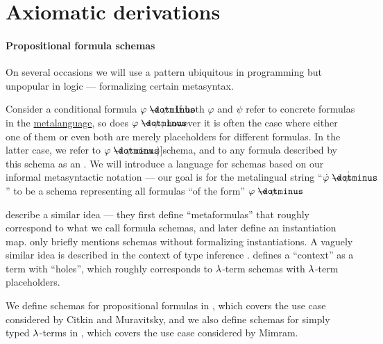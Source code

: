 \section{Axiomatic derivations}\label{sec:axiomatic_derivations}

\paragraph{Propositional formula schemas}

\begin{concept}\label{con:schemas_and_instances}
  On several occasions we will use a pattern ubiquitous in programming but unpopular in logic --- formalizing certain metasyntax.

  Consider a conditional formula \( \varphi \synimplies \psi \). If both \( \varphi \) and \( \psi \) refer to concrete formulas in the \hyperref[con:metalanguage]{metalanguage}, so does \( \varphi \synimplies \psi \), however it is often the case where either one of them or even both are merely placeholders for different formulas. In the latter case, we refer to \( \varphi \synimplies \psi \) as a \term[ru=схема (формул) (\cite[20]{Эдельман1975Логика})]{schema}, and to any formula described by this schema as an . We will introduce a language for schemas based on our informal metasyntactic notation --- our goal is for the metalingual string \enquote{\( \syn\varphi \synimplies \syn\psi \)} to be a schema representing all formulas \enquote{of the form} \( \varphi \synimplies \psi \).

   describe a similar idea --- they first define \enquote{metaformulas} that roughly correspond to what we call formula schemas, and later define an instantiation map.  only briefly mentions schemas without formalizing instantiations. A vaguely similar idea is described in the context of type inference .  defines a \enquote{context} as a term with \enquote{holes}, which roughly corresponds to \( {\mathrm \lambda} \)-term schemas with \( {\mathrm \lambda} \)-term placeholders.

  We define schemas for propositional formulas in , which covers the use case considered by Citkin and Muravitsky, and we also define schemas for simply typed \( {\mathrm \lambda} \)-terms in , which covers the use case considered by Mimram.
\end{concept}

